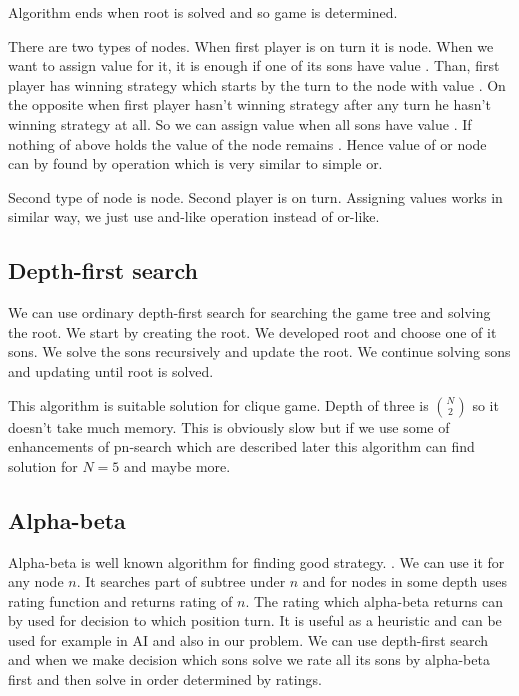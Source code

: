 Algorithm ends when root is solved and so game is determined.

There are two types of nodes. When first player is on turn it is 
node. When we want to assign value \value{true} for it, it is enough if one of its sons
have value \value{true}. Than, first player has winning strategy which starts by the
turn to the node with value \value{true}. On the opposite when first player hasn't
winning strategy after any turn he hasn't winning strategy at all. So we can
assign value \value{false} when all sons have value \value{false}. If nothing of above holds
the value of the node remains \value{unknown}. Hence value of or node can by found by
operation which is very similar to simple or.

Second type of node is  node. Second player is on turn. Assigning values
works in similar way, we just use and-like operation instead of or-like.


\subsection{Depth-first search}
We can use ordinary depth-first search for searching the game tree and solving the root.
We start by creating the root. We developed root and choose one of it sons. We solve the sons
recursively and update the root. We continue solving sons and updating until root is solved.

This algorithm is suitable solution for clique game. Depth of three is $N \choose 2$ so it
doesn't take much memory. This is obviously slow but if we use some of enhancements of pn-search which
are described later this algorithm can find solution for $N=5$ and maybe more.

\subsection{Alpha-beta}

Alpha-beta is well known algorithm for finding good strategy. .
We can use it for any node $n$. It searches part of subtree under $n$ and for
nodes in some depth uses rating function and returns rating of $n$. The rating
which alpha-beta returns can by used for decision to which position turn. It
is useful as a heuristic and can be used for example in AI and also in our
problem. We can use depth-first search and when we make decision which sons
solve we rate all its sons by alpha-beta first and then solve in order
determined by ratings.

